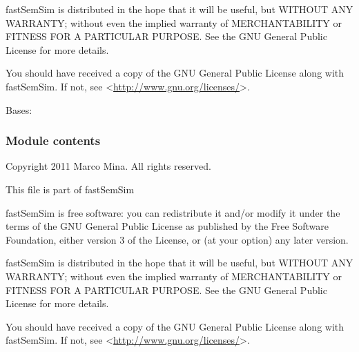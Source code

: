 \documentclass[letterpaper,10pt,english]{sphinxmanual}
\begin{document}
fastSemSim is distributed in the hope that it will be useful,
but WITHOUT ANY WARRANTY; without even the implied warranty of
MERCHANTABILITY or FITNESS FOR A PARTICULAR PURPOSE.  See the
GNU General Public License for more details.

You should have received a copy of the GNU General Public License
along with fastSemSim.  If not, see \textless{}\href{http://www.gnu.org/licenses/}{http://www.gnu.org/licenses/}\textgreater{}.

\begin{fulllineitems}
\label{fastsemsim.SemSim:fastsemsim.SemSim.maxSemSim.maxSemSim}
Bases: {\hyperref[fastsemsim.SemSim:fastsemsim.SemSim.MixSemSim.MixSemSim]{}}

\end{fulllineitems}



\subsubsection{Module contents}
\label{fastsemsim.SemSim:module-fastsemsim.SemSim}\label{fastsemsim.SemSim:module-contents}
Copyright 2011 Marco Mina. All rights reserved.

This file is part of fastSemSim

fastSemSim is free software: you can redistribute it and/or modify
it under the terms of the GNU General Public License as published by
the Free Software Foundation, either version 3 of the License, or
(at your option) any later version.

fastSemSim is distributed in the hope that it will be useful,
but WITHOUT ANY WARRANTY; without even the implied warranty of
MERCHANTABILITY or FITNESS FOR A PARTICULAR PURPOSE.  See the
GNU General Public License for more details.

You should have received a copy of the GNU General Public License
along with fastSemSim.  If not, see \textless{}\href{http://www.gnu.org/licenses/}{http://www.gnu.org/licenses/}\textgreater{}.

\begin{fulllineitems}
\label{fastsemsim.SemSim:fastsemsim.SemSim.select_mix_SemSim}
\end{fulllineitems}
\end{document}
